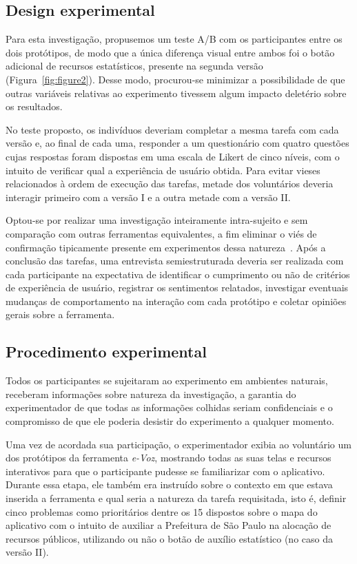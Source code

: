 \documentclass{sigchi}
\begin{document}
\subsection{Design experimental}
Para esta investigação, propusemos um teste A/B com os participantes entre os dois protótipos, de modo que a única diferença visual entre ambos foi o botão adicional de recursos estatísticos, presente na segunda versão (Figura~\ref{fig:figure2}). Desse modo, procurou-se minimizar a possibilidade de que outras variáveis relativas ao experimento tivessem algum impacto deletério sobre os resultados.

No teste proposto, os indivíduos deveriam completar a mesma tarefa com cada versão e, ao final de cada uma, responder a um questionário com quatro questões cujas respostas foram dispostas em uma escala de Likert de cinco níveis, com o intuito de verificar qual a experiência de usuário obtida. Para evitar vieses relacionados à ordem de execução das tarefas, metade dos voluntários deveria interagir primeiro com a versão I e a outra metade com a versão II.

Optou-se por realizar uma investigação inteiramente intra-sujeito e sem comparação com outras ferramentas equivalentes, a fim eliminar o viés de confirmação tipicamente presente em experimentos dessa natureza~\cite{dell:2012}. Após a conclusão das tarefas, uma entrevista semiestruturada deveria ser realizada com cada participante na expectativa de identificar o cumprimento ou não de critérios de experiência de usuário, registrar os sentimentos relatados, investigar eventuais mudanças de comportamento na interação com cada protótipo e coletar opiniões gerais sobre a ferramenta.

\subsection{Procedimento experimental}
Todos os participantes se sujeitaram ao experimento em ambientes naturais, receberam informações sobre natureza da investigação, a garantia do experimentador de que todas as informações colhidas seriam confidenciais e o compromisso de que ele poderia desistir do experimento a qualquer momento.

Uma vez de acordada sua participação, o experimentador exibia ao voluntário um dos protótipos da ferramenta \textit{e-Voz}, mostrando todas as suas telas e recursos interativos para que o participante pudesse se familiarizar com o aplicativo. Durante essa etapa, ele também era instruído sobre o contexto em que estava inserida a ferramenta e qual seria a natureza da tarefa requisitada, isto é, definir cinco problemas como prioritários dentre os 15 dispostos sobre o mapa do aplicativo com o intuito de auxiliar a Prefeitura de São Paulo na alocação de recursos públicos, utilizando ou não o botão de auxílio estatístico (no caso da versão II).
\end{document}
